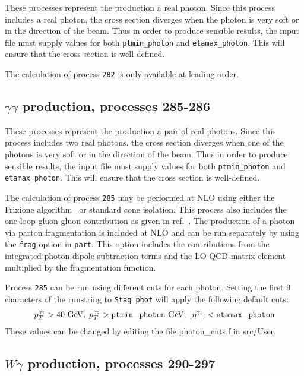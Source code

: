 \documentclass[12pt]{article}
\begin{document}
These processes represent the production a real photon.
Since this process includes a real photon, the cross section diverges
when the photon is very soft or in the direction of the beam.
Thus in order to produce sensible results, the input file must supply values for both
{\tt ptmin\_photon} and {\tt etamax\_photon}. This will ensure that
the cross section is well-defined.

The calculation of process {\tt 282} is only available at leading order.

\subsection{$\gamma\gamma$ production, processes 285-286}
\label{subsec:gamgam}

These processes represent the production a pair of real photons.
Since this process includes two real photons, the cross section diverges
when one of the photons is very soft or in the direction of the beam.
Thus in order to produce sensible results, the input file must supply values for both
{\tt ptmin\_photon} and {\tt etamax\_photon}. This will ensure that
the cross section is well-defined.

The calculation of process {\tt 285} may be performed at NLO using either the
Frixione algorithm~\cite{Frixione:1998jh} or standard cone isolation.  This process also includes
the one-loop gluon-gluon contribution as given in
ref.~\cite{Bern:2002jx}.  The production of a photon via parton fragmentation is included at NLO and 
can be run separately by using the {\tt frag} option in {\tt part}. This option includes the contributions from the integrated 
photon dipole subtraction terms and the LO QCD matrix element multiplied by the fragmentation function.  

Process {\tt 285} can be run using different cuts for each photon. Setting the first 9 characters of the runstring to 
{\tt Stag\_phot} will apply the following default cuts:
\begin{eqnarray*}
p_T^{\gamma_1} > 40~\mbox{GeV}, \; p_T^{\gamma_2} > {\tt ptmin\_photon}~\mbox{GeV}, \; |\eta^{\gamma_i}| < {\tt etamax\_photon}
\end{eqnarray*} 
These values can be changed by editing the file photon\_cuts.f in src/User. 

\subsection{$W\gamma$ production, processes 290-297}
\label{subsec:wgamma}
\end{document}

